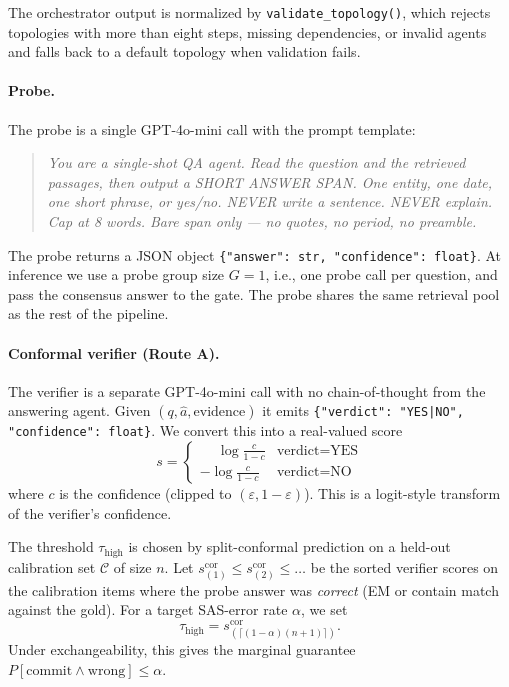 \documentclass[11pt]{article}
\newcommand{\code}[1]{\texttt{\small #1}}
\begin{document}
The orchestrator output is normalized by \code{validate\_topology()}, which
rejects topologies with more than eight steps, missing dependencies, or
invalid agents and falls back to a default topology when validation fails.

\paragraph{Probe.}
The probe is a single GPT-4o-mini call with the prompt template:
\begin{quote}\small
\textit{You are a single-shot QA agent. Read the question and the retrieved
passages, then output a SHORT ANSWER SPAN. One entity, one date, one short
phrase, or yes/no. NEVER write a sentence. NEVER explain. Cap at 8 words.
Bare span only --- no quotes, no period, no preamble.}
\end{quote}
The probe returns a JSON object \code{\{"answer": str, "confidence": float\}}.
At inference we use a probe group size $G=1$, i.e., one probe call per
question, and pass the consensus answer to the gate. The probe shares the
same retrieval pool as the rest of the pipeline.

\paragraph{Conformal verifier (Route A).}
The verifier is a separate GPT-4o-mini call with no chain-of-thought from
the answering agent. Given $(q, \hat{a}, \text{evidence})$ it emits
\code{\{"verdict": "YES|NO", "confidence": float\}}. We convert this into
a real-valued score
\begin{equation}
s = \begin{cases}
\phantom{-}\log\frac{c}{1-c} & \text{verdict}=\text{YES}\\
-\log\frac{c}{1-c} & \text{verdict}=\text{NO}
\end{cases}
\label{eq:score}
\end{equation}
where $c$ is the confidence (clipped to $(\varepsilon, 1-\varepsilon)$).
This is a logit-style transform of the verifier's confidence.

The threshold $\tau_{\text{high}}$ is chosen by split-conformal prediction
on a held-out calibration set $\mathcal{C}$ of size $n$. Let
$s^{\text{cor}}_{(1)} \leq s^{\text{cor}}_{(2)} \leq \dots$ be the sorted
verifier scores on the calibration items where the probe answer was
\emph{correct} (EM or contain match against the gold). For a target
SAS-error rate $\alpha$, we set
\begin{equation}
\tau_{\text{high}} = s^{\text{cor}}_{(\lceil (1-\alpha)(n+1)\rceil)}.
\label{eq:tauhigh}
\end{equation}
Under exchangeability, this gives the marginal guarantee
$P[\text{commit} \wedge \text{wrong}] \leq \alpha$.
\end{document}
